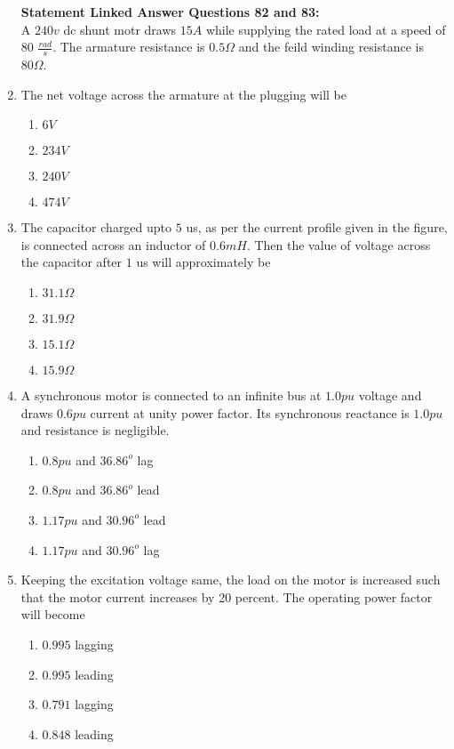 \documentclass[journal]{IEEEtran}
\begin{document}
\begin{enumerate}
 \textbf{Statement Linked Answer Questions 82 and 83:}\\
A $240 v$ dc shunt motr draws $15 A$ while supplying the rated load at a speed of $80$ $\frac{rad}{s}$. The armature resistance is $0.5 \Omega$ and the feild winding resistance is $80 \Omega$.\\
\item The net voltage across the armature at the plugging will be 
\begin{enumerate}
    \item $6 V$ 
    \item $234 V$
    \item $240 V$
    \item $474 V$
\end{enumerate}
\item The capacitor charged upto $5$ us, as per the current profile given in the figure, is connected across an inductor of $0.6 mH$. Then the value of voltage across the capacitor after $1$ us will approximately be
\begin{enumerate}
    \item $31.1\Omega$
    \item $31.9\Omega$
    \item $15.1\Omega$
    \item $15.9\Omega$
\end{enumerate}
\item A synchronous motor is connected to an infinite bus at $1.0 pu$ voltage and draws $0.6 pu$ current at unity power factor. Its synchronous reactance is $1.0 pu$ and resistance is negligible.
\begin{enumerate}
    \item $0.8 pu$ and $36.86^o$ lag
    \item $0.8 pu$ and $36.86^o$ lead
    \item $1.17 pu$ and $30.96^o$ lead
    \item $1.17 pu$ and $30.96^o$ lag
\end{enumerate}
\item Keeping the excitation voltage same, the load on the motor is increased such that the motor current increases by 20 percent. The operating power factor will become
\begin{enumerate}
    \item $0.995$ lagging 
    \item $0.995$ leading
    \item $0.791$ lagging
    \item $0.848$ leading
\end{enumerate}
 \end{enumerate}
\end{document}
